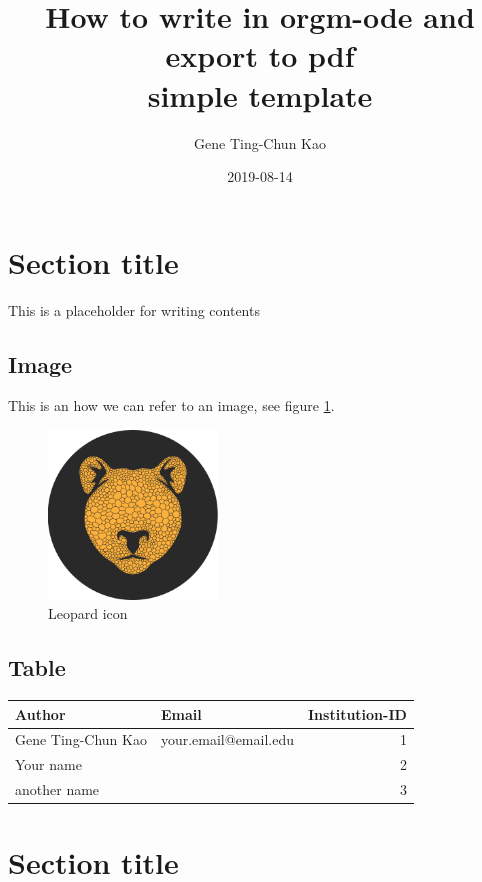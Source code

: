 \documentclass[a4paper,11pt]{article}
\author{Gene Ting-Chun Kao}
\date{2019-08-14}
\title{How to write in orgm-ode and export to pdf\\\medskip
\large simple template}
\begin{document}
\maketitle


\section*{Section title}
\label{sec:orga9eb49b}

This is a placeholder for writing contents


\subsection*{Image}
\label{sec:org7933e6b}

This is an how we can refer to an image, see figure \ref{fig:orgf7ad9dd}.

\begin{figure}[htbp]
\centering
\includegraphics[width=0.4\textwidth]{./images/Leopard-ICON-circle.png}
\caption{\label{fig:orgf7ad9dd}
Leopard icon}
\end{figure}

\subsection*{Table}
\label{sec:org29fa1ac}

\begin{center}
\begin{tabular}{llr}
Author & Email & Institution-ID\\
\hline
Gene Ting-Chun Kao & your.email@email.edu & 1\\
Your name &  & 2\\
another name &  & 3\\
\end{tabular}
\end{center}



\section*{Section title}
\label{sec:org845ff2f}
\end{document}
